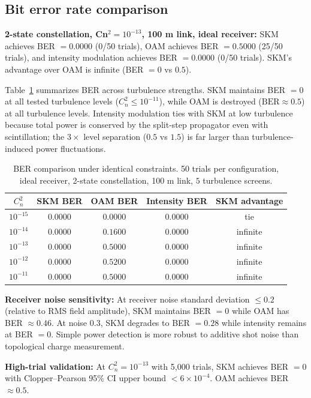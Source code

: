 \documentclass[11pt]{article}
\begin{document}
\subsection{Bit error rate comparison}

\textbf{2-state constellation, Cn$^2 = 10^{-13}$, 100 m link, ideal receiver:}
SKM achieves BER $= 0.0000$ (0/50 trials), OAM achieves BER $= 0.5000$
(25/50 trials), and intensity modulation achieves BER $= 0.0000$ (0/50
trials). SKM's advantage over OAM is infinite (BER $=0$ vs $0.5$).

Table~\ref{tab:ber} summarizes BER across turbulence strengths. SKM
maintains BER $=0$ at all tested turbulence levels ($C_n^2 \le 10^{-11}$),
while OAM is destroyed ($\mathrm{BER} \approx 0.5$) at all turbulence
levels. Intensity modulation ties with SKM at low turbulence because total
power is conserved by the split-step propagator even with scintillation;
the $3\times$ level separation ($0.5$ vs $1.5$) is far larger than
turbulence-induced power fluctuations.

\begin{table}[h]
\centering
\caption{BER comparison under identical constraints. 50 trials per
configuration, ideal receiver, 2-state constellation, 100 m link,
$5$ turbulence screens.}
\label{tab:ber}
\begin{tabular}{ccccc}
\toprule
$C_n^2$ & SKM BER & OAM BER & Intensity BER & SKM advantage \\
\midrule
$10^{-15}$ & $0.0000$ & $0.0000$ & $0.0000$ & tie \\
$10^{-14}$ & $0.0000$ & $0.1600$ & $0.0000$ & infinite \\
$10^{-13}$ & $0.0000$ & $0.5000$ & $0.0000$ & infinite \\
$10^{-12}$ & $0.0000$ & $0.5200$ & $0.0000$ & infinite \\
$10^{-11}$ & $0.0000$ & $0.5000$ & $0.0000$ & infinite \\
\bottomrule
\end{tabular}
\end{table}

\textbf{Receiver noise sensitivity:} At receiver noise standard deviation
$\le 0.2$ (relative to RMS field amplitude), SKM maintains BER $=0$ while
OAM has BER $\approx 0.46$. At noise $0.3$, SKM degrades to BER $=0.28$
while intensity remains at BER $=0$. Simple power detection is more robust
to additive shot noise than topological charge measurement.

\textbf{High-trial validation:} At $C_n^2 = 10^{-13}$ with 5,000 trials,
SKM achieves BER $=0$ with Clopper--Pearson 95\% CI upper bound
$< 6\times 10^{-4}$. OAM achieves BER $\approx 0.5$.
\end{document}
